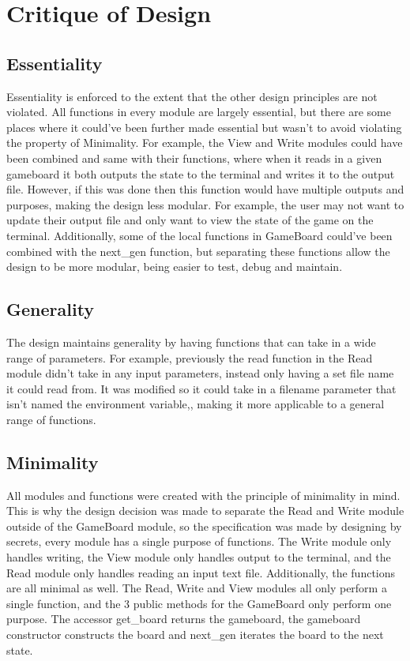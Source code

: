 \documentclass[12pt]{article}
\begin{document}
\newpage

\section*{Critique of Design}

\subsection{Essentiality}

Essentiality is enforced to the extent that the other design principles are not violated. All functions in every module are largely essential, but there are some places where it could've been further made essential but wasn't to avoid violating the property of Minimality. For example, the View and Write modules could have been combined and same with their functions, where when it reads in a given gameboard it both outputs the state to the terminal and writes it to the output file. However, if this was done then this function would have multiple outputs and purposes, making the design less modular. For example, the user may not want to update their output file and only want to view the state of the game on the terminal.  Additionally, some of the local functions in GameBoard could've been combined with the next\_gen function, but separating these functions allow the design to be more modular, being easier to test, debug and maintain.

\subsection{Generality}

The design maintains generality by having functions that can take in a wide range of parameters. For example, previously the read function in the Read module didn't take in any input parameters, instead only having a set file name it could read from. It was modified so it could take in a filename parameter that isn't named the environment variable,, making it more applicable to a general range of functions.   

\subsection{Minimality}

All modules and functions were created with the principle of minimality in mind. This is why the design decision was made to separate the Read and Write module outside of the GameBoard module, so the specification was made by designing by secrets, every module has a single purpose of functions. The Write module only handles writing, the View module only handles output to the terminal, and the Read module only handles reading an input text file. Additionally, the functions are all minimal as well. The Read, Write and View modules all only perform a single function, and the 3 public methods for the GameBoard only perform one purpose. The accessor get\_board returns the gameboard, the gameboard constructor constructs the board and next\_gen iterates the board to the next state.
\end{document}
